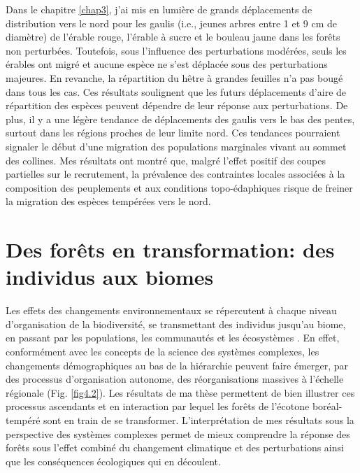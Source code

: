 Dans le chapitre \ref{chap3}, j'ai mis en lumière de grands déplacements
de distribution vers le nord pour les gaulis (i.e., jeunes arbres entre
1 et 9 cm de diamètre) de l'érable rouge, l'érable à sucre et le bouleau
jaune dans les forêts non perturbées. Toutefois, sous l'influence des
perturbations modérées, seuls les érables ont migré et aucune espèce ne
s'est déplacée sous des perturbations majeures. En revanche, la
répartition du hêtre à grandes feuilles n'a pas bougé dans tous les cas.
Ces résultats soulignent que les futurs déplacements d'aire de
répartition des espèces peuvent dépendre de leur réponse aux
perturbations. De plus, il y a une légère tendance de déplacements des
gaulis vers le bas des pentes, surtout dans les régions proches de leur
limite nord. Ces tendances pourraient signaler le début d'une migration
des populations marginales vivant au sommet des collines. Mes résultats
ont montré que, malgré l'effet positif des coupes partielles sur le
recrutement, la prévalence des contraintes locales associées à la
composition des peuplements et aux conditions topo-édaphiques risque de
freiner la migration des espèces tempérées vers le nord.

\hypertarget{des-foruxeats-en-transformation-des-individus-aux-biomes}{%
\section{Des forêts en transformation: des individus aux
biomes}\label{des-foruxeats-en-transformation-des-individus-aux-biomes}}

Les effets des changements environnementaux se répercutent à chaque
niveau d'organisation de la biodiversité, se transmettant des individus
jusqu'au biome, en passant par les populations, les communautés et les
écosystèmes \citep{bellard_impacts_2012, parmesan_globally_2003}. En
effet, conformément avec les concepts de la science des systèmes
complexes, les changements démographiques au bas de la hiérarchie
peuvent faire émerger, par des processus d'organisation autonome, des
réorganisations massives à l'échelle régionale (Fig. \ref{fig4.2}). Les
résultats de ma thèse permettent de bien illustrer ces processus
ascendants et en interaction par lequel les forêts de l'écotone
boréal-tempéré sont en train de se transformer. L'interprétation de mes
résultats sous la perspective des systèmes complexes permet de mieux
comprendre la réponse des forêts sous l'effet combiné du changement
climatique et des perturbations ainsi que les conséquences écologiques
qui en découlent.

